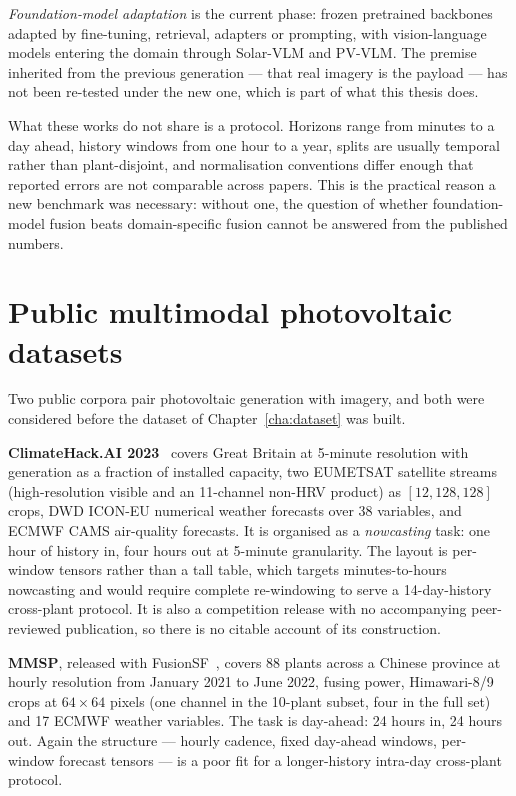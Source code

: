 \emph{Foundation-model adaptation} is the current phase: frozen pretrained backbones adapted
by fine-tuning, retrieval, adapters or prompting, with vision-language models entering the
domain through Solar-VLM and PV-VLM. The premise inherited from the previous generation ---
that real imagery is the payload --- has not been re-tested under the new one, which is part
of what this thesis does.

What these works do not share is a protocol. Horizons range from minutes to a day ahead,
history windows from one hour to a year, splits are usually temporal rather than
plant-disjoint, and normalisation conventions differ enough that reported errors are not
comparable across papers. This is the practical reason a new benchmark was necessary:
without one, the question of whether foundation-model fusion beats domain-specific fusion
cannot be answered from the published numbers.

\section{Public multimodal photovoltaic datasets}
\label{sec:other-datasets}

Two public corpora pair photovoltaic generation with imagery, and both were considered
before the dataset of Chapter~\ref{cha:dataset} was built.

\textbf{ClimateHack.AI 2023}~\cite{climatehackai} covers Great Britain at 5-minute
resolution with generation as a fraction of installed capacity, two EUMETSAT satellite
streams (high-resolution visible and an 11-channel non-HRV product) as
$[12,128,128]$ crops, DWD ICON-EU numerical weather forecasts over 38 variables, and ECMWF
CAMS air-quality forecasts. It is organised as a \emph{nowcasting} task: one hour of
history in, four hours out at 5-minute granularity. The layout is per-window tensors rather
than a tall table, which targets minutes-to-hours nowcasting and would require complete
re-windowing to serve a 14-day-history cross-plant protocol. It is also a competition
release with no accompanying peer-reviewed publication, so there is no citable account of
its construction.

\textbf{MMSP}, released with FusionSF~\cite{fusionsf}, covers 88 plants across a Chinese
province at hourly resolution from January 2021 to June 2022, fusing power, Himawari-8/9
crops at $64 \times 64$ pixels (one channel in the 10-plant subset, four in the full set)
and 17 ECMWF weather variables. The task is day-ahead: 24 hours in, 24 hours out. Again the
structure --- hourly cadence, fixed day-ahead windows, per-window forecast tensors --- is a
poor fit for a longer-history intra-day cross-plant protocol.

